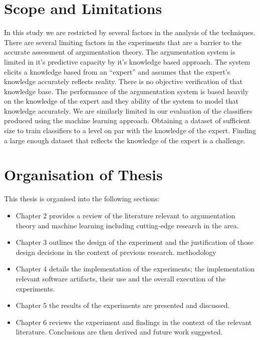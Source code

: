 
\section{Scope and Limitations}

In this study we are restricted by several factors in the analysis of the techniques.
There are several limiting factors in the experiments that are a barrier to the accurate assessment of argumentation theory.
The argumentation system is limited in it's predictive capacity by it's knowledge based approach.
The system elicits a knowledge based from an ``expert'' and assumes that the expert's knowledge accurately reflects reality.
There is no objective verification of that knowledge base. The performance of the argumentation system is based heavily on the knowledge of the expert and they ability of the system to model that knowledge accurately.
We are similarly limited in our evaluation of the classifiers produced using the machine learning approach.
Obtaining a dataset of sufficient size to train classifiers to a level on par with the knowledge of the expert.
Finding a large enough dataset that reflects the knowledge of the expert is a challenge.


\section{Organisation of Thesis}

This thesis is organised into the following sections:

\begin{itemize}

  \item Chapter 2 provides a review of the literature relevant to argumentation theory and machine learning including cutting-edge research in the area.
  \item Chapter 3 outlines the design of the experiment and the justification of those design decisions in the context of previous research. methodology
  \item Chapter 4 details the implementation of the experiments; the implementation relevant software artifacts, their use and the overall execution of the experiments.
  \item Chapter 5 the results of the experiments are presented and discussed.
  \item Chapter 6 reviews the experiment and findings in the context of the relevant literature. Conclusions are then derived and future work suggested.

\end{itemize}
